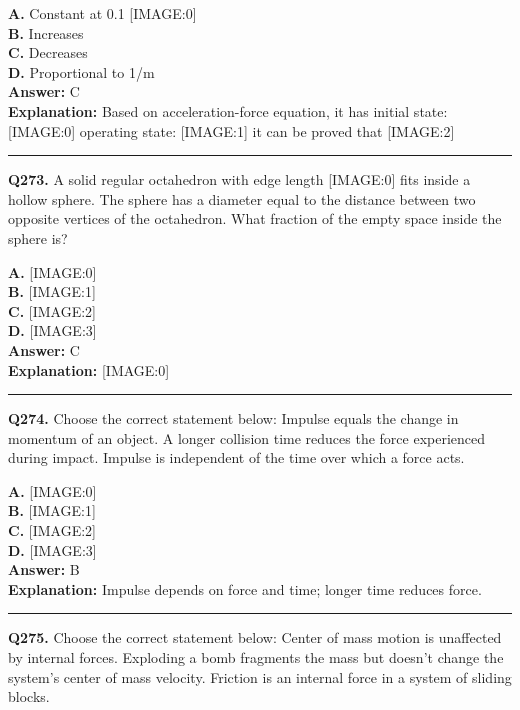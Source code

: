 \documentclass[12pt]{article}
\begin{document}
\textbf{A.} Constant at 0.1
[IMAGE:0] \\
\textbf{B.} Increases \\
\textbf{C.} Decreases \\
\textbf{D.} Proportional to 1/m \\

\textbf{Answer:} C \\
\textbf{Explanation:} Based on acceleration-force equation, it has
initial state:
[IMAGE:0]
operating state:
[IMAGE:1]
it can be proved that
[IMAGE:2]

\hrule
\vspace{1em}


\noindent
\textbf{Q273.} A solid regular octahedron with edge length
[IMAGE:0]
fits inside a hollow sphere. The sphere has a diameter equal to the distance between two opposite vertices of the octahedron. What fraction of the empty space inside the sphere is?



\textbf{A.} [IMAGE:0] \\
\textbf{B.} [IMAGE:1] \\
\textbf{C.} [IMAGE:2] \\
\textbf{D.} [IMAGE:3] \\

\textbf{Answer:} C \\
\textbf{Explanation:} [IMAGE:0]

\hrule
\vspace{1em}


\noindent
\textbf{Q274.} Choose the correct statement below:
Impulse equals the change in momentum of an object.
A longer collision time reduces the force experienced during impact.
Impulse is independent of the time over which a force acts.



\textbf{A.} [IMAGE:0] \\
\textbf{B.} [IMAGE:1] \\
\textbf{C.} [IMAGE:2] \\
\textbf{D.} [IMAGE:3] \\

\textbf{Answer:} B \\
\textbf{Explanation:} Impulse depends on force and time; longer time reduces force.

\hrule
\vspace{1em}


\noindent
\textbf{Q275.} Choose the correct statement below:
Center of mass motion is unaffected by internal forces.
Exploding a bomb fragments the mass but doesn’t change the system’s center of mass velocity.
Friction is an internal force in a system of sliding blocks.
\end{document}
